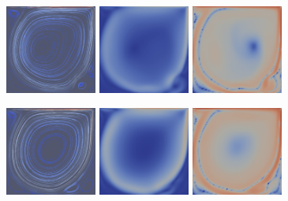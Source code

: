 \documentclass[english, nochinese]{pkupaper}
\begin{document}
\begin{figure}
{
\centering
{
\includegraphics[width=3cm]{Results/Figure01b.pdf}
\includegraphics[width=3cm]{Results/Figure01a.pdf}
\includegraphics[width=3cm]{Results/Figure02e.pdf}
}

{
\includegraphics[width=3cm]{Results/Figure01e.pdf}
\includegraphics[width=3cm]{Results/Figure01d.pdf}
\includegraphics[width=3cm]{Results/Figure02j.pdf}
}

}
\end{figure}
\end{document}
